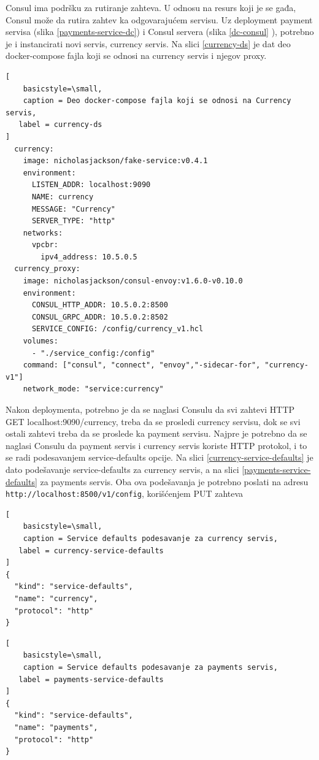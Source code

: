 \documentclass[a4paper,12pt]{report}
\begin{document}
Consul ima podršku za rutiranje zahteva. U odnosu na resurs koji je se gađa, Consul može da rutira zahtev ka odgovarajućem servisu. Uz deployment payment servisa (slika \ref{payments-service-dc}) i Consul servera (slika \ref{dc-consul} ), potrebno je i instancirati novi servis, currency servis. Na slici \ref{currency-ds} je dat deo docker-compose fajla koji se odnosi na currency servis i njegov proxy. \newline 

\begin{lstlisting}[
    basicstyle=\small,
    caption = Deo docker-compose fajla koji se odnosi na Currency servis, 
   label = currency-ds
]
  currency:
    image: nicholasjackson/fake-service:v0.4.1
    environment:
      LISTEN_ADDR: localhost:9090
      NAME: currency
      MESSAGE: "Currency"
      SERVER_TYPE: "http"
    networks:
      vpcbr:
        ipv4_address: 10.5.0.5
  currency_proxy:
    image: nicholasjackson/consul-envoy:v1.6.0-v0.10.0
    environment:
      CONSUL_HTTP_ADDR: 10.5.0.2:8500
      CONSUL_GRPC_ADDR: 10.5.0.2:8502
      SERVICE_CONFIG: /config/currency_v1.hcl
    volumes:
      - "./service_config:/config"
    command: ["consul", "connect", "envoy","-sidecar-for", "currency-v1"]
    network_mode: "service:currency"
\end{lstlisting}

Nakon deploymenta, potrebno je da se naglasi Consulu da svi zahtevi HTTP GET localhost:9090/currency, treba da se prosledi currency servisu, dok se svi ostali zahtevi treba da se proslede ka payment servisu. Najpre je potrebno da se naglasi Consulu da payment servis i currency servis koriste HTTP protokol, i to se radi podesavanjem service-defaults opcije. Na slici \ref{currency-service-defaults} je dato podešavanje service-defaults za currency servis, a na slici \ref{payments-service-defaults} za payments servis. Oba ova podešavanja je potrebno poslati na adresu \texttt{http://localhost:8500/v1/config}, korišćenjem PUT zahteva \newline

\begin{lstlisting}[
    basicstyle=\small,
    caption = Service defaults podesavanje za currency servis, 
   label = currency-service-defaults
]
{
  "kind": "service-defaults",
  "name": "currency",
  "protocol": "http"
}
\end{lstlisting}

\begin{lstlisting}[
    basicstyle=\small,
    caption = Service defaults podesavanje za payments servis, 
   label = payments-service-defaults
]
{
  "kind": "service-defaults",
  "name": "payments",
  "protocol": "http"
}
\end{lstlisting}
\end{document}
